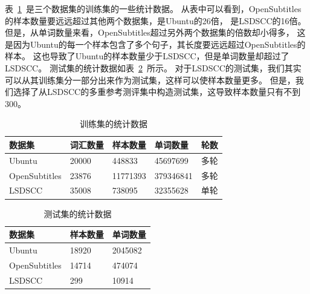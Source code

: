 表~\ref{tab:train_set_stats}~是三个数据集的训练集的一些统计数据。
从表中可以看到，OpenSubtitles的样本数量要远远超过其他两个数据集，是Ubuntu的26倍， 是LSDSCC的16倍。
但是，从单词数量来看，OpenSubtitles超过另外两个数据集的倍数却小得多，
这是因为Ubuntu的每一个样本包含了多个句子，其长度要远远超过OpenSubtitles的样本。
这也导致了Ubuntu的样本数量少于LSDSCC，但是单词数量却超过了LSDSCC。
测试集的统计数据如表~\ref{tab:test_set_stats}~所示。
对于LSDSCC的测试集，我们其实可以从其训练集分一部分出来作为测试集，这样可以使样本数量更多。
但是，我们选择了从LSDSCC的多重参考测评集中构造测试集，这导致样本数量只有不到300。

\begin{table}[H]
    \centering
    \caption{训练集的统计数据}
    \label{tab:train_set_stats}
    \begin{tabular}{lllll}
        \toprule
        数据集 & 词汇数量 & 样本数量 & 单词数量 & 轮数 \\
        \midrule
        Ubuntu & 20000 & 448833 & 45697699 & 多轮 \\
        OpenSubtitles & 23876 & 11771393 & 379346841 & 多轮 \\
        LSDSCC & 35008 & 738095 & 32355628 & 单轮 \\
        \bottomrule
    \end{tabular}
\end{table}

\begin{table}[H]
    \centering
    \caption{测试集的统计数据}
    \label{tab:test_set_stats}
    \begin{tabular}{lll}
        \toprule
        数据集 & 样本数量 & 单词数量 \\
        \midrule
        Ubuntu & 18920 & 2045082   \\
        OpenSubtitles & 14714 & 474074 \\
        LSDSCC & 299 & 10914 \\
        \bottomrule
    \end{tabular}
\end{table}


